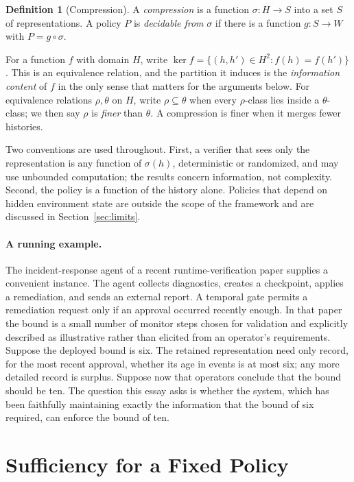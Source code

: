 \documentclass[11pt]{article}
\theoremstyle{definition}
\newtheorem{definition}{Definition}
\theoremstyle{remark}
\newcommand{\Hist}{H}
\begin{document}
\begin{definition}[Compression]
A \emph{compression} is a function $\sigma:\Hist\to S$ into a set $S$ of representations. A policy $P$ is \emph{decidable from} $\sigma$ if there is a function $g:S\to W$ with $P=g\circ\sigma$.
\end{definition}

For a function $f$ with domain $\Hist$, write $\ker f=\{(h,h')\in\Hist^2: f(h)=f(h')\}$. This is an equivalence relation, and the partition it induces is the \emph{information content} of $f$ in the only sense that matters for the arguments below. For equivalence relations $\rho,\theta$ on $\Hist$, write $\rho\subseteq\theta$ when every $\rho$-class lies inside a $\theta$-class; we then say $\rho$ is \emph{finer} than $\theta$. A compression is finer when it merges fewer histories.

Two conventions are used throughout. First, a verifier that sees only the representation is any function of $\sigma(h)$, deterministic or randomized, and may use unbounded computation; the results concern information, not complexity. Second, the policy is a function of the history alone. Policies that depend on hidden environment state are outside the scope of the framework and are discussed in Section~\ref{sec:limits}.

\paragraph{A running example.}
The incident-response agent of a recent runtime-verification paper \cite{agenticrv} supplies a convenient instance. The agent collects diagnostics, creates a checkpoint, applies a remediation, and sends an external report. A temporal gate permits a remediation request only if an approval occurred recently enough. In that paper the bound is a small number of monitor steps chosen for validation and explicitly described as illustrative rather than elicited from an operator's requirements. Suppose the deployed bound is six. The retained representation need only record, for the most recent approval, whether its age in events is at most six; any more detailed record is surplus. Suppose now that operators conclude that the bound should be ten. The question this essay asks is whether the system, which has been faithfully maintaining exactly the information that the bound of six required, can enforce the bound of ten.

\section{Sufficiency for a Fixed Policy}\label{sec:fixed}
\end{document}
